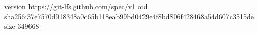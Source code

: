 version https://git-lfs.github.com/spec/v1
oid sha256:37e7570d918348a0c65b118eab99bd0429e4f8bd806f428468a54d607c3515de
size 349668
